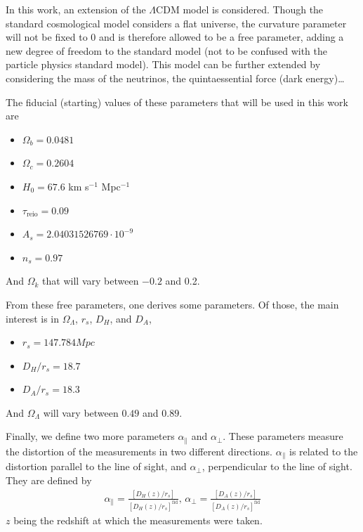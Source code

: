 In this work, an extension of the $\Lambda$CDM model is considered. Though the standard cosmological model considers a flat universe, the curvature parameter will not be fixed to $0$ and is therefore allowed to be a free parameter, adding a new degree of freedom to the standard model (not to be confused with the particle physics standard model). This model can be further extended by considering the mass of the neutrinos, the quintaessential force (dark energy)\ldots 

The fiducial (starting) values of these parameters that will be used in this work are
\begin{itemize}
	\item 	$\Omega_b =  0.0481 $
	\item 	$\Omega_c =  0.2604$ 
	\item $H_0 = 67.6$ km s$ ^{-1}$ Mpc$^{-1}$
	\item $\tau_{\text{reio}} = 0.09$
	\item $A_s = 2.04031526769\cdot 10^{-9}$
	\item $n_s = 0.97$
\end{itemize}
And $\Omega _k$ that will vary between $-0.2$ and 0.2.

From these free parameters, one derives some parameters. Of those, the main interest is in $\Omega_\Lambda$, $r_s$, $D_H$, and $D_A$, 
\begin{itemize}
	\item $r_s = 147.784 Mpc$
	\item $D_H/r_s  = 18.7$
	\item $D_A/r_s  = 18.3$
\end{itemize}
And $\Omega_\Lambda$ will vary between $0.49$ and $0.89$.

Finally, we define two more parameters $\alpha_\parallel$ and $\alpha_\perp$. These parameters measure the distortion of the measurements in two different directions. $\alpha_\parallel$ is related to the distortion parallel to the line of sight, and  $\alpha_\perp$, perpendicular to the line of sight. They are defined by 
\begin{align}
	\alpha_\parallel = \frac{\left[ D_H(z) /r_s \right] }{\left[ D_H(z)/r_s \right]^{\text{fid}} }, \, \alpha_\perp = \frac{\left[ D_A(z) /r_s \right] }{\left[ D_A(z)/r_s \right]^{\text{fid}} }
\end{align}
$z$ being the redshift at which the measurements were taken.
